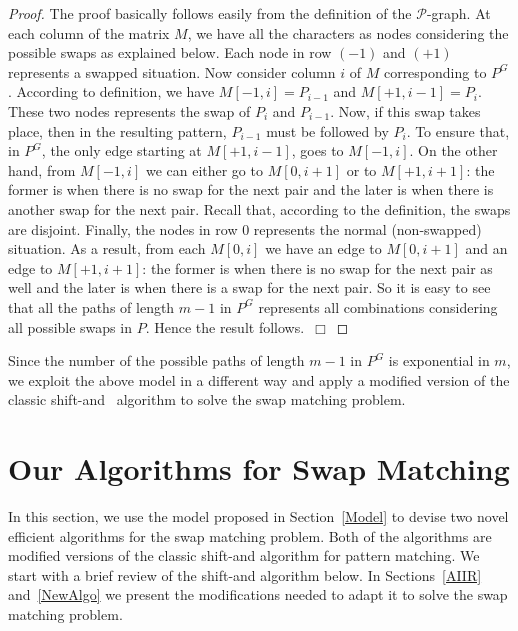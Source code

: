 \documentclass{llncs}
\begin{document}
\begin{proof}
The proof basically follows easily from the definition of the
$\mathcal P$-graph. At each column of the matrix $M$, we have all
the characters as nodes considering the possible swaps as explained
below. Each node in row $(-1)$ and $(+1)$ represents a swapped
situation. Now consider column $i$ of $M$ corresponding to $P^G$.
According to definition, we have $M[-1,i] = P_{i-1}$ and $M[+1,i-1]
= P_{i}$. These two nodes represents the swap of $P_{i}$ and
$P_{i-1}$. Now, if this swap takes place, then in the resulting
pattern, $P_{i-1}$ must be followed by $P_i$. To ensure that, in
$P^G$, the only edge starting at $M[+1,i-1]$, goes to $M[-1,i]$. On
the other hand, from $M[-1,i]$ we can either go to $M[0,i+1]$ or to
$M[+1,i+1]$: the former is when there is no swap for the next pair
and the later is when there is another swap for the next pair.
Recall that, according to the definition, the swaps are disjoint.
Finally, the nodes in row $0$ represents the normal (non-swapped)
situation. As a result, from each $M[0,i]$ we have an edge to
$M[0,i+1]$ and an edge to $M[+1,i+1]$: the former is when there is
no swap for the next pair as well and the later is when there is a
swap for the next pair. So it is easy to see that all the paths of
length $m-1$ in $P^G$ represents all combinations considering all
possible swaps in $P$. Hence the result follows.~$\Box$
\end{proof}


Since the number of the possible paths of length $m-1$ in $P^G$ is exponential in $m$, we exploit the above model in a different way and apply a modified version of the classic shift-and~\cite{BG92} algorithm to solve the swap matching problem.



















\section{\label{Algo}Our Algorithms for Swap Matching}
In this section, we use the model proposed in Section~\ref{Model} to devise two novel efficient algorithms for the swap matching problem. Both of the algorithms are modified versions of the classic shift-and algorithm for pattern matching. We start with a brief review of the shift-and algorithm below. In Sections~\ref{AIIR} and~\ref{NewAlgo} we present the modifications needed to adapt it to solve the swap matching problem.
\end{document}
